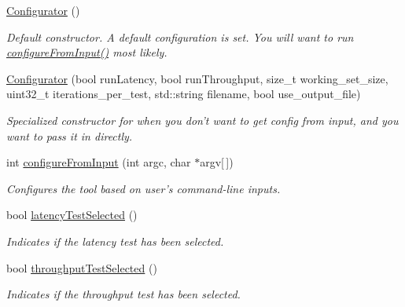 \begin{DoxyCompactItemize}
\item 
\hypertarget{classxmem_1_1config_1_1_configurator_a8ae41e8976253affae2b905cb7ca2389}{\hyperlink{classxmem_1_1config_1_1_configurator_a8ae41e8976253affae2b905cb7ca2389}{Configurator} ()}\label{classxmem_1_1config_1_1_configurator_a8ae41e8976253affae2b905cb7ca2389}

\begin{DoxyCompactList}\small\item\em Default constructor. A default configuration is set. You will want to run \hyperlink{classxmem_1_1config_1_1_configurator_acd25216c6c3db19dd68a5f2ec9b0a061}{configure\-From\-Input()} most likely. \end{DoxyCompactList}\item 
\hyperlink{classxmem_1_1config_1_1_configurator_ab687c798957f36943f2af563fd67f402}{Configurator} (bool run\-Latency, bool run\-Throughput, size\-\_\-t working\-\_\-set\-\_\-size, uint32\-\_\-t iterations\-\_\-per\-\_\-test, std\-::string filename, bool use\-\_\-output\-\_\-file)
\begin{DoxyCompactList}\small\item\em Specialized constructor for when you don't want to get config from input, and you want to pass it in directly. \end{DoxyCompactList}\item 
int \hyperlink{classxmem_1_1config_1_1_configurator_acd25216c6c3db19dd68a5f2ec9b0a061}{configure\-From\-Input} (int argc, char $\ast$argv\mbox{[}$\,$\mbox{]})
\begin{DoxyCompactList}\small\item\em Configures the tool based on user's command-\/line inputs. \end{DoxyCompactList}\item 
bool \hyperlink{classxmem_1_1config_1_1_configurator_abb15795a835f9d17205d442120b720a9}{latency\-Test\-Selected} ()
\begin{DoxyCompactList}\small\item\em Indicates if the latency test has been selected. \end{DoxyCompactList}\item 
bool \hyperlink{classxmem_1_1config_1_1_configurator_a21bfd5b3c29b32223ea59e08aebcfe8c}{throughput\-Test\-Selected} ()
\begin{DoxyCompactList}\small\item\em Indicates if the throughput test has been selected. \end{DoxyCompactList}\item 

\end{DoxyCompactItemize}
